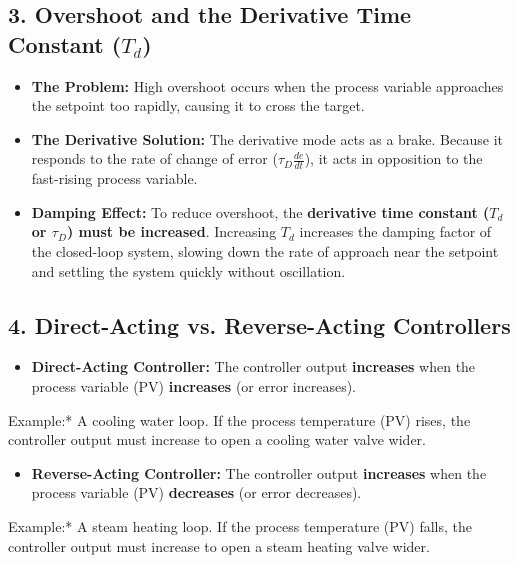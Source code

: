 \subsection{3. Overshoot and the Derivative Time Constant ($T_d$)}
\begin{itemize}
  \item   \textbf{The Problem:} High overshoot occurs when the process variable approaches the setpoint too rapidly, causing it to cross the target.
  \item   \textbf{The Derivative Solution:} The derivative mode acts as a brake. Because it responds to the rate of change of error ($\tau_D \frac{de}{dt}$), it acts in opposition to the fast-rising process variable.
  \item   \textbf{Damping Effect:} To reduce overshoot, the \textbf{derivative time constant ($T_d$ or $\tau_D$) must be increased}. Increasing $T_d$ increases the damping factor of the closed-loop system, slowing down the rate of approach near the setpoint and settling the system quickly without oscillation.
\end{itemize}

\subsection{4. Direct-Acting vs. Reverse-Acting Controllers}
\begin{itemize}
  \item   \textbf{Direct-Acting Controller:} The controller output \textbf{increases} when the process variable (PV) \textbf{increases} (or error increases).
\end{itemize}
    \textit{   }Example:* A cooling water loop. If the process temperature (PV) rises, the controller output must increase to open a cooling water valve wider.
\begin{itemize}
  \item   \textbf{Reverse-Acting Controller:} The controller output \textbf{increases} when the process variable (PV) \textbf{decreases} (or error decreases).
\end{itemize}
    \textit{   }Example:* A steam heating loop. If the process temperature (PV) falls, the controller output must increase to open a steam heating valve wider.

